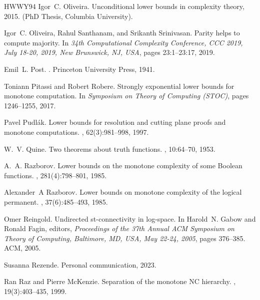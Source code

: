 \documentclass[10pt,a4paper]{article}
\begin{document}
\begin{thebibliography}{HWWY94}
Igor~C. Oliveira.
\newblock Unconditional lower bounds in complexity theory, 2015.
\newblock (PhD Thesis, Columbia University).

Igor~C. Oliveira, Rahul Santhanam, and Srikanth Srinivasan.
\newblock Parity helps to compute majority.
\newblock In {\em 34th Computational Complexity Conference, {CCC} 2019, July
  18-20, 2019, New Brunswick, NJ, {USA}}, pages 23:1--23:17, 2019.

Emil~L. Post.
.
\newblock Princeton University Press, 1941.

Toniann Pitassi and Robert Robere.
\newblock Strongly exponential lower bounds for monotone computation.
\newblock In {\em Symposium on Theory of Computing \emph{(STOC)}}, pages
  1246--1255, 2017.

Pavel Pudl{\'{a}}k.
\newblock Lower bounds for resolution and cutting plane proofs and monotone
  computations.
, 62(3):981--998, 1997.

W.~V. Quine.
\newblock Two theorems about truth functions.
, 10:64--70, 1953.

A.~A. Razborov.
\newblock Lower bounds on the monotone complexity of some {B}oolean functions.
, 281(4):798--801, 1985.

Alexander~A Razborov.
\newblock Lower bounds on monotone complexity of the logical permanent.
,
  37(6):485--493, 1985.

Omer Reingold.
\newblock Undirected st-connectivity in log-space.
\newblock In Harold~N. Gabow and Ronald Fagin, editors, {\em Proceedings of the
  37th Annual {ACM} Symposium on Theory of Computing, Baltimore, MD, USA, May
  22-24, 2005}, pages 376--385. {ACM}, 2005.

Susanna Rezende.
\newblock Personal communication, 2023.

Ran Raz and Pierre McKenzie.
\newblock Separation of the monotone {NC} hierarchy.
, 19(3):403--435, 1999.


\end{thebibliography}
\end{document}
